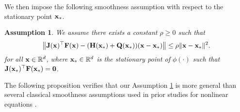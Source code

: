 \documentclass[11pt]{article}
\theoremstyle{plain}
\newtheorem{assumption}[theorem]{Assumption}
\theoremstyle{definition}
\theoremstyle{remark}
\theoremstyle{plain}
\def\vzero{{\bf{0}}}
\def\vx{{\bf{x}}}
\def\BR{{\mathbb{R}}}
\def\mF {{\bf F}}
\def\mJ {{\bf J}}
\def\vx {{{\bf x}}}
\def\BR{{\mathbb{R}}}
\def\F{{\bf F}}
\def\H{{\bf H}}
\def \J{{\bf J}}
\def\Q{{\bf Q}}
\def\x{{\bf x}}
\begin{document}
We then impose the following smoothness assumption with respect to the stationary point $\vx_*$.
\begin{assumption}
\label{ass:x_star_philip}
    We assume there exists a constant $\rho\geq 0$ such that 
    \begin{align}
        \label{eq:x_star_philip}
        \big\|\J(\x)^{\top}\F(\x)-(\H(\x_*)+\Q(\x_*))(\x-\x_*)\big\| \leq \rho \|\x-\x_*\|^2.
    \end{align}
    for all $\vx\in\BR^d$, where $\vx_*\in\BR^d$ is the stationary point of $\phi(\cdot)$ such that $\mJ(\vx_*)^\top\mF(\vx_*)=\vzero$.
\end{assumption}
The following proposition verifies that our Assumption \ref{ass:x_star_philip} is more general than several classical smoothness assumptions used in prior studies for nonlinear equations \citep{gould2019convergence,zhou2010global,vater2024convergence,liu2023block}.
\end{document}
